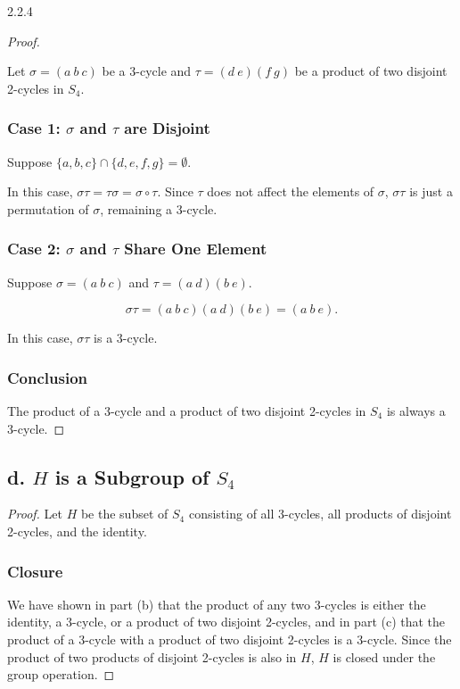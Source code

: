 \documentclass[12pt]{amsart}
\theoremstyle{definition}
\numberwithin{equation}{section}
\begin{document}
\begin{exercise}{2.2.4}
    \begin{proof}\( \)
    
    Let \(\sigma = (a \ b \ c)\) be a 3-cycle and \(\tau = (d \ e)(f \ g)\) be a product of two disjoint 2-cycles in \(S_4\).
    
    \subsubsection*{Case 1: \(\sigma\) and \(\tau\) are Disjoint}
    Suppose \(\{a, b, c\} \cap \{d, e, f, g\} = \emptyset\).
    
    In this case, \(\sigma \tau = \tau \sigma = \sigma \circ \tau\). Since \(\tau\) does not affect the elements of \(\sigma\), \(\sigma \tau\) is just a permutation of \(\sigma\), remaining a 3-cycle.
    
    \subsubsection*{Case 2: \(\sigma\) and \(\tau\) Share One Element}
    Suppose \(\sigma = (a \ b \ c)\) and \(\tau = (a \ d)(b \ e)\).
    
    \[
    \sigma \tau = (a \ b \ c)(a \ d)(b \ e) = (a \ b \ e).
    \]
    
    In this case, \(\sigma \tau\) is a 3-cycle.
    
    \subsubsection*{Conclusion}
    The product of a 3-cycle and a product of two disjoint 2-cycles in \(S_4\) is always a 3-cycle.
    
    \end{proof}
    
    \subsection*{\textbf{d. \(H\) is a Subgroup of \(S_4\)}}
    
    \begin{proof}
    
    Let \(H\) be the subset of \(S_4\) consisting of all 3-cycles, all products of disjoint 2-cycles, and the identity.
    
    \subsubsection*{Closure}
    We have shown in part (b) that the product of any two 3-cycles is either the identity, a 3-cycle, or a product of two disjoint 2-cycles, and in part (c) that the product of a 3-cycle with a product of two disjoint 2-cycles is a 3-cycle. Since the product of two products of disjoint 2-cycles is also in \(H\), \(H\) is closed under the group operation.
    

\end{proof}
\end{exercise}
\end{document}

